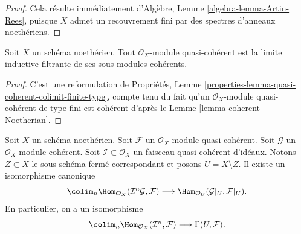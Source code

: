 \begin{proof}
Cela résulte immédiatement d'Algèbre,
Lemme \ref{algebra-lemma-Artin-Rees},
puisque $X$ admet un recouvrement fini par des spectres d'anneaux noethériens.
\end{proof}

\begin{lemma}
\label{lemma-directed-colimit-coherent}
Soit $X$ un schéma noethérien. Tout $\mathcal{O}_X$-module quasi-cohérent
est la limite inductive filtrante de ses sous-modules cohérents.
\end{lemma}

\begin{proof}
C'est une reformulation de Propriétés, Lemme
\ref{properties-lemma-quasi-coherent-colimit-finite-type},
compte tenu du fait qu'un
$\mathcal{O}_X$-module quasi-cohérent de type fini est cohérent d'après le
Lemme \ref{lemma-coherent-Noetherian}.
\end{proof}

\begin{lemma}
\label{lemma-homs-over-open}
Soit $X$ un schéma noethérien.
Soit $\mathcal{F}$ un $\mathcal{O}_X$-module quasi-cohérent.
Soit $\mathcal{G}$ un $\mathcal{O}_X$-module cohérent.
Soit $\mathcal{I} \subset \mathcal{O}_X$ un faisceau quasi-cohérent
d'idéaux. Notons $Z \subset X$ le sous-schéma fermé correspondant et
posons $U = X \setminus Z$.
Il existe un isomorphisme canonique
$$
\colim_n \Hom_{\mathcal{O}_X}(\mathcal{I}^n\mathcal{G}, \mathcal{F})
\longrightarrow
\Hom_{\mathcal{O}_U}(\mathcal{G}|_U, \mathcal{F}|_U).
$$
En particulier, on a un isomorphisme
$$
\colim_n \Hom_{\mathcal{O}_X}(
\mathcal{I}^n, \mathcal{F})
\longrightarrow
\Gamma(U, \mathcal{F}).
$$
\end{lemma}

